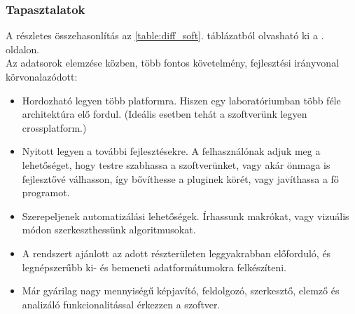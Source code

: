 \documentclass[a4paper,12pt,oneside]{report}
\begin{document}
\subsubsection{Tapasztalatok}
A részletes összehasonlítás az \ref{table:diff_soft}. táblázatból olvasható ki a \pageref{table:diff_soft}. oldalon.\\

Az adatsorok elemzése közben, több fontos követelmény, fejlesztési irányvonal körvonalazódott:
\begin{itemize}
	\itemsep0em
	\item Hordozható legyen több platformra. Hiszen egy laboratóriumban több féle architektúra elő fordul. (Ideális esetben tehát a szoftverünk legyen crossplatform.)
	\item Nyitott legyen a további fejlesztésekre. A felhasználónak adjuk meg a lehetőséget, hogy testre szabhassa a szoftverünket, vagy akár önmaga is fejlesztővé válhasson, így bővíthesse a pluginek körét, vagy javíthassa a fő programot.

	\item Szerepeljenek automatizálási lehetőségek. Írhassunk makrókat, vagy vizuális módon szerkeszthessünk algoritmusokat.
	\item A rendszert ajánlott az adott részterületen leggyakrabban előforduló, és legnépszerűbb ki- és  bemeneti adatformátumokra felkészíteni.
	\item Már gyárilag nagy mennyiségű képjavító, feldolgozó, szerkesztő, elemző és analizáló funkcionalitással érkezzen a szoftver.

\end{itemize}
\end{document}
